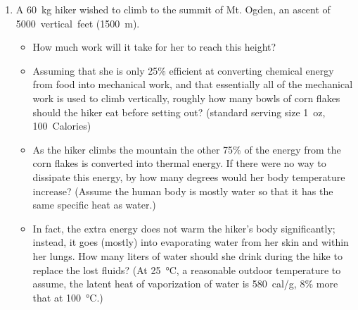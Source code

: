 \begin{enumerate}
\item
A \SI{60}{\kilogram} hiker wished to climb to the summit of Mt. Ogden, an ascent of \SI{5000}{vertical feet} (\SI{1500}{\meter}). 
\begin{itemize}
\setlength\itemsep{2 in}
\item How much work will it take for her to reach this height?
\item Assuming that she is only 25\% efficient at converting chemical energy from food into mechanical work, and that essentially all of the mechanical work is used to climb vertically, roughly how many bowls of corn flakes should the hiker eat before setting out? (standard serving size \SI{1}{oz}, \SI{100}{Calories})
\item As the hiker climbs the mountain the other 75\% of the energy from the corn flakes is converted into thermal energy. If there were no way to dissipate this energy, by how many degrees would her body temperature increase? (Assume the human body is mostly water so that it has the same specific heat as water.)
\item In fact, the extra energy does not warm the hiker's body significantly; instead, it goes (mostly) into evaporating water from her skin and within her lungs. How many liters of water should she drink during the hike to replace the lost fluids? (At \SI{25}{\celsius}, a reasonable outdoor temperature to assume, the latent heat of vaporization of water is \SI{580}{cal/g}, 8\% more that at \SI{100}{\celsius}.)
\end{itemize}



\end{enumerate}